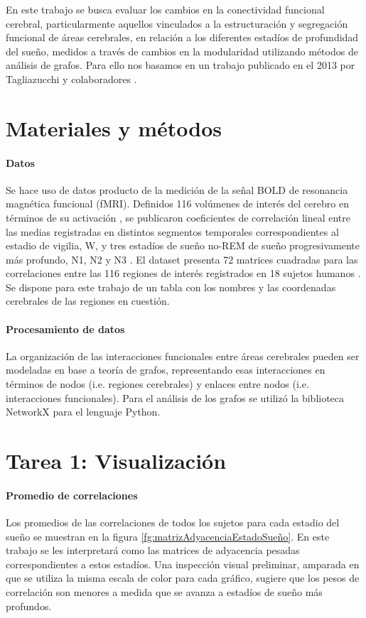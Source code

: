 \documentclass{article}
\begin{document}
En este trabajo se busca evaluar los cambios en la conectividad funcional cerebral, particularmente aquellos vinculados a la estructuración y segregación funcional de áreas cerebrales, en relación a los diferentes estadíos de profundidad del sueño, medidos a través de cambios en la modularidad utilizando métodos de análisis de grafos.
Para ello nos basamos en un trabajo publicado en el 2013 por Tagliazucchi y colaboradores \cite{tagliazucchi_large-scale_2013}.


\section{Materiales y métodos}

\paragraph{Datos}
Se hace uso de datos producto de la medición de la señal BOLD de resonancia magnética funcional (fMRI).
Definidos 116 volúmenes de interés del cerebro en términos de su activación \cite{tzourio-mazoyer_automated_2002}, se publicaron coeficientes de correlación lineal entre las medias registradas en distintos segmentos temporales correspondientes al estadio de vigilia, W, y tres estadíos de sueño no-REM de sueño progresivamente más profundo, N1, N2 y N3 \cite{patel_physiology_2023}.
El dataset presenta 72 matrices cuadradas para las correlaciones entre las 116 regiones de interés registrados en 18 sujetos humanos \cite{tagliazucchi_large-scale_2013}. Se dispone para este trabajo de un tabla con los nombres y las coordenadas cerebrales de las regiones en cuestión.

\paragraph{Procesamiento de datos} 
La organización de las interacciones funcionales entre áreas cerebrales pueden ser modeladas en base a teoría de grafos, representando esas interacciones en términos de nodos (i.e. regiones cerebrales) y enlaces entre nodos (i.e. interacciones funcionales). Para el análisis de los grafos se utilizó la biblioteca NetworkX \cite{hagberg_exploring_2008} para el lenguaje Python. 

\section{Tarea 1: Visualización}

\paragraph*{Promedio de correlaciones}
Los promedios de las correlaciones de todos los sujetos para cada estadio del sueño se muestran en la figura \ref{fg:matrizAdyacenciaEstadoSueño}.
En este trabajo se les interpretará como las matrices de adyacencia pesadas correspondientes a estos estadíos.
Una inspección visual preliminar, amparada en que se utiliza la misma escala de color para cada gráfico, sugiere que los pesos de correlación son menores a medida que se avanza a estadíos de sueño más profundos.
\end{document}
